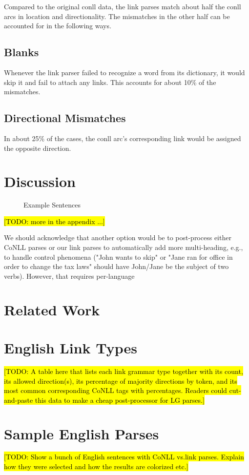 \documentclass[11pt]{article}
\newcommand{\Note}[1]{}
\renewcommand{\Note}[1]{\hl{[#1]}}  %
\newcommand{\TODO}[1]{\Note{TODO: #1}}
\begin{document}
Compared to the original conll data, the link parses match about half the conll arcs in location and directionality. The mismatches in the other half can be accounted for in the following ways.

\subsection{Blanks}
Whenever the link parser failed to recognize a word from its dictionary, it would skip it and fail to attach any links. This accounts for about 10\% of the mismatches.

\subsection{Directional Mismatches}
In about 25\% of the cases, the conll arc's corresponding link would be assigned the opposite direction.


\section{Discussion}


\begin{figure}[ht!]
  \centering
  
  \caption{Example Sentences}
\end{figure}

\TODO{more in the appendix ...}


We should acknowledge that another option would be to post-process either CoNLL parses or our link parses to automatically add more multi-heading, e.g., to handle control phenomena ("John wants to skip" or "Jane ran for office in order to change the tax laws" should have John/Jane be the subject of two verbs).  However, that requires per-language 

\section{Related Work}






\appendix
\section{English Link Types}

\TODO{A table here that lists each link grammar type together with its
  count, its allowed direction(s), its percentage of majority
  directions by token, and its most common corresponding CoNLL tags
  with percentages.  Readers could cut-and-paste this data to make a 
  cheap post-processor for LG parses.}

\section{Sample English Parses}

\TODO{Show a bunch of English sentences with CoNLL vs.\@ link parses.
  Explain how they were selected and how the results are colorized etc.}
\end{document}
